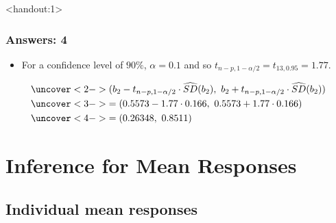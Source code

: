 \documentclass[handout]{beamer}\usepackage{graphicx, color}
\newcommand{\answers}{1}
\providecommand{\wh}[1]{\widehat{#1}}
\numberwithin{equation}{section}
\begin{document}
\begin{frame}<handout:\answers>
\frametitle{Answers: 4} \small
\begin{itemize}
\item For a confidence level of $90\%$, $\alpha = 0.1$ and so $t_{n - p, 1 - \alpha/2} = t_{13, 0.95} =1.77$.
\end{itemize}
\begin{align*}
&\uncover<2->{(b_2 - t_{n - p, 1 - \alpha/2} \cdot \wh{SD}(b_2), \ b_2 + t_{n - p, 1 - \alpha/2}\cdot \wh{SD}(b_2))} \\
&\uncover<3->{=  (0.5573 - 1.77 \cdot 0.166, \ 0.5573 +1.77 \cdot 0.166)} \\
&\uncover<4->{= (0.26348, \ 0.8511)}
\end{align*}
\begin{itemize}
\end{itemize}
\end{frame}





\section{Inference for Mean Responses}

\subsection{Individual mean responses}
\end{document}
